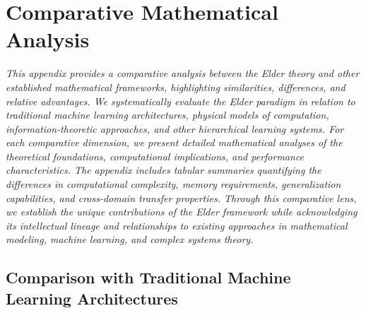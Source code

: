 \chapter{Comparative Mathematical Analysis}

\textit{This appendix provides a comparative analysis between the Elder theory and other established mathematical frameworks, highlighting similarities, differences, and relative advantages. We systematically evaluate the Elder paradigm in relation to traditional machine learning architectures, physical models of computation, information-theoretic approaches, and other hierarchical learning systems. For each comparative dimension, we present detailed mathematical analyses of the theoretical foundations, computational implications, and performance characteristics. The appendix includes tabular summaries quantifying the differences in computational complexity, memory requirements, generalization capabilities, and cross-domain transfer properties. Through this comparative lens, we establish the unique contributions of the Elder framework while acknowledging its intellectual lineage and relationships to existing approaches in mathematical modeling, machine learning, and complex systems theory.}

\section{Comparison with Traditional Machine Learning Architectures}


